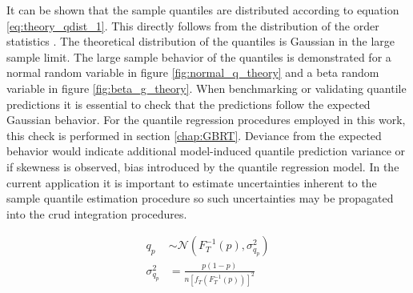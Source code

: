
It can be shown that the sample quantiles are distributed according to equation \ref{eq:theory_qdist_1}.  This directly follows from the distribution of the order statistics \cite{mosteller1946}.  The theoretical distribution of the quantiles is Gaussian in the large sample limit.  The large sample behavior of the quantiles is demonstrated for a normal random variable in figure \ref{fig:normal_q_theory} and a beta random variable in figure \ref{fig:beta_g_theory}.  When benchmarking or validating quantile predictions it is essential to check that the predictions follow the expected Gaussian behavior.  For the quantile regression procedures employed in this work, this check is performed in section \ref{chap:GBRT}.  Deviance from the expected behavior would indicate additional model-induced quantile prediction variance or if skewness is observed, bias introduced by the quantile regression model.  In the current application it is important to estimate uncertainties inherent to the sample quantile estimation procedure so such uncertainties may be propagated into the crud integration procedures.

\begin{align}
    q_p &\sim \mathcal N \left( F_T^{-1}(p), \sigma^2_{q_p} \right) \nonumber \\
    \sigma^2_{q_p} &= \frac{p(1 - p)}{n[f_T(F_T^{-1}(p))]^2}
    \label{eq:theory_qdist_1}
\end{align}


